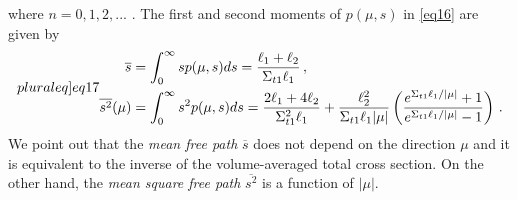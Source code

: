 \documentclass[12pt]{article}
\begin{document}
where $n=0, 1, 2, ...$ . The first and second moments of $p(\mu,s)$ in \cref{eq16} are given by
\begin{subequations}\label[pluraleq]{eq17}
\begin{align}
\overline{s} &= \int_0^\infty sp(\mu,s)ds = \frac{\ell_1+\ell_2}{\Sigma_{t1}\ell_1}\, ,\\
\overline{s^2}(\mu) &= \int_0^\infty s^2p(\mu,s)ds = \frac{2\ell_1+4\ell_2}{\Sigma_{t1}^2\ell_1}+\frac{\ell_2^2}{\Sigma_{t1}\ell_1|\mu|}\left(\frac{e^{\Sigma_{t1}\ell_1/|\mu|}+1}{e^{\Sigma_{t1}\ell_1/|\mu|}-1}\right)\, .
\end{align}
\end{subequations}
We point out that the {\em mean free path} $\overline{s}$ does not depend on the direction $\mu$ and it is equivalent to the inverse of the volume-averaged total cross section. On the other hand, the {\em mean square free path} $\overline{s^2}$ is a function of $|\mu|$.
\end{document}
